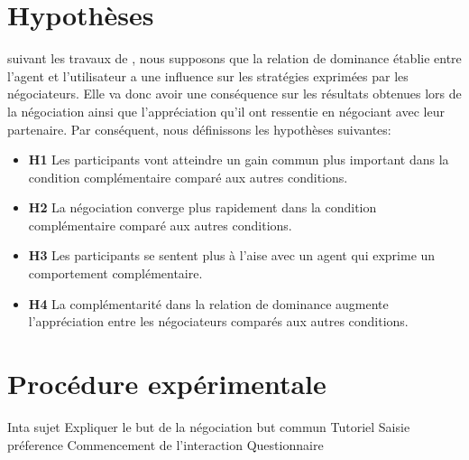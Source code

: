 \section{Hypothèses}

	suivant les travaux de \cite{}, nous supposons que la relation de dominance établie entre l'agent et l'utilisateur a une influence sur les stratégies exprimées par les négociateurs. Elle va donc avoir une conséquence sur les résultats obtenues lors de la négociation ainsi que l'appréciation qu'il ont ressentie en négociant avec leur partenaire. Par conséquent, nous définissons les hypothèses suivantes: 
		\begin{itemize}
			\item \textbf{H1} Les participants vont atteindre un gain commun plus important dans la condition complémentaire comparé aux autres conditions. 
			\item \textbf{H2} La négociation converge plus rapidement dans la condition complémentaire comparé aux autres conditions. 
			\item \textbf{H3} Les participants se sentent plus à l'aise avec un agent qui exprime un comportement complémentaire.
			\item \textbf{H4} La complémentarité dans la relation de dominance augmente l'appréciation entre les négociateurs comparés aux autres conditions.
		\end{itemize}




\section{Procédure expérimentale}
\label{sec:procedure}
Inta sujet
Expliquer le but de la négociation 
but commun
Tutoriel
Saisie préference
Commencement de l'interaction
Questionnaire


